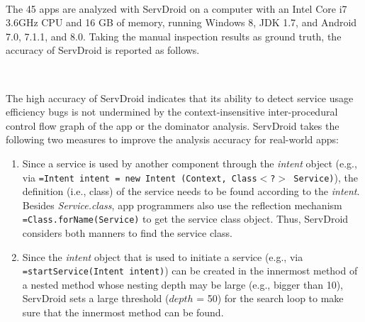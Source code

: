 \documentclass[conference]{IEEEtran}
\newcommand{\hytt}[1]{\texttt{\hyphenchar\font=\defaulthyphenchar #1}}
\begin{document}
\medskip
{\setlength{\parindent}{0 em}
}\\
\medskip

The 45 apps are analyzed with \textsf{ServDroid} on a computer with an Intel Core i7 3.6GHz CPU and 16 GB of memory, running Windows 8, JDK 1.7, and Android 7.0, 7.1.1, and 8.0. Taking the manual inspection results as ground truth, the accuracy of \textsf{ServDroid} is reported as follows.

\medskip
{\setlength{\parindent}{0 em}
}\\
\medskip

The high accuracy of \textsf{ServDroid} indicates that its ability to detect service usage efficiency bugs is not undermined by the context-insensitive inter-procedural control flow graph of the app or the dominator analysis. \textsf{ServDroid} takes the following two measures to improve the analysis accuracy for real-world apps:
\begin{enumerate}
\item Since a service is used by another component through the \textit{intent} object (e.g., via \hytt{Intent intent = new Intent (Context, Class$<$?$>$ Service)}), the definition (i.e., class) of the service needs to be found according to the \textit{intent}. Besides \textit{Service.class}, app programmers also use the reflection mechanism \hytt{Class.forName(Service)} to get the service class object. Thus, \textsf{ServDroid} considers both manners to find the service class. 
\item Since the \textit{intent} object that is used to initiate a service (e.g., via \hytt{startService(Intent intent)}) can be created in the innermost method of a nested method whose nesting depth may be large (e.g., bigger than 10), \textsf{ServDroid} sets a large threshold ($depth$ = 50) for the search loop to make sure that the innermost method can be found. 
\end{enumerate}
\end{document}
